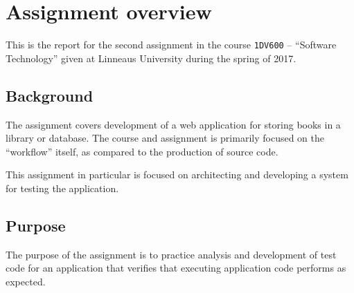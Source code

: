 %
%
%
%


\section{Assignment overview}
This is the report for the second assignment in the course \texttt{1DV600} --
``Software Technology'' given at Linneaus University during the spring of 2017.


\subsection{Background}
The assignment covers development of a web application for storing books in a
library or database. The course and assignment is primarily focused on the
``workflow'' itself, as compared to the production of source code.

This assignment in particular is focused on architecting and developing a
system for testing the application.

\subsection{Purpose}
The purpose of the assignment is to practice analysis and development of test
code for an application that verifies that executing application code performs
as expected.

